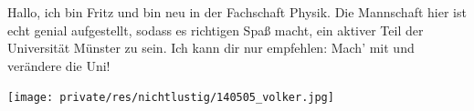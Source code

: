 \begin{multicols*}{2}
{Hallo, ich bin Fritz und bin neu in der Fachschaft Physik.
Die Mannschaft hier ist echt genial aufgestellt, sodass es richtigen Spaß macht, ein aktiver Teil der Universität Münster zu sein.
Ich kann dir nur empfehlen: Mach' mit und verändere die Uni!}

\vspace{\fill}

\texttt{[image: private/res/nichtlustig/140505\_volker.jpg]}

\vspace{7ex}
\end{multicols*}
